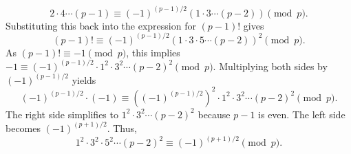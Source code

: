 \begin{enumerate}
\begin{subprove}
  \[
  2 \cdot 4 \cdots (p-1) \equiv (-1)^{(p-1)/2} (1 \cdot 3 \cdots (p-2)) \pmod{p}.
  \]
  Substituting this back into the expression for $(p-1)!$ gives
  \[
  (p-1)! \equiv (-1)^{(p-1)/2} (1 \cdot 3 \cdot 5 \cdots (p-2))^2 \pmod{p}.
  \]
  As $(p-1)! \equiv -1 \pmod{p}$, this implies $-1 \equiv (-1)^{(p-1)/2} \cdot 1^2 \cdot 3^2 \cdots (p-2)^2 \pmod{p}$. 
  Multiplying both sides by $(-1)^{(p-1)/2}$ yields
  \[
  (-1)^{(p-1)/2} \cdot (-1) \equiv ((-1)^{(p-1)/2})^2 \cdot 1^2 \cdot 3^2 \cdots (p-2)^2 \pmod{p}.
  \]
  The right side simplifies to $1^2 \cdot 3^2 \cdots (p-2)^2$ because $p-1$ is even. The left side becomes $(-1)^{(p+1)/2}$. Thus,
  \[
  1^2 \cdot 3^2 \cdot 5^2 \cdots (p-2)^2 \equiv (-1)^{(p+1)/2} \pmod{p}.
  \]
\end{subprove}
\end{enumerate}

















   
  
